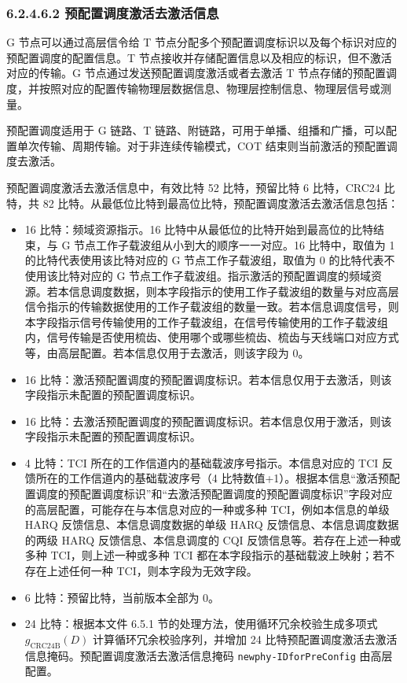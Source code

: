 \documentclass[11pt,a4paper]{ctexart}
\begin{document}
\subsubsection{6.2.4.6.2 预配置调度激活去激活信息}

G 节点可以通过高层信令给 T 节点分配多个预配置调度标识以及每个标识对应的预配置调度的配置信息。T 节点接收并存储配置信息以及相应的标识，但不激活对应的传输。G 节点通过发送预配置调度激活或者去激活 T 节点存储的预配置调度，并按照对应的配置传输物理层数据信息、物理层控制信息、物理层信号或测量。

预配置调度适用于 G 链路、T 链路、附链路，可用于单播、组播和广播，可以配置单次传输、周期传输。对于非连续传输模式，COT 结束则当前激活的预配置调度去激活。

预配置调度激活去激活信息中，有效比特 52 比特，预留比特 6 比特，CRC24 比特，共 82 比特。从最低位比特到最高位比特，预配置调度激活去激活信息包括：
\begin{itemize}[nosep]
  \item 16 比特：频域资源指示。16 比特中从最低位的比特开始到最高位的比特结束，与 G 节点工作子载波组从小到大的顺序一一对应。16 比特中，取值为 1 的比特代表使用该比特对应的 G 节点工作子载波组，取值为 0 的比特代表不使用该比特对应的 G 节点工作子载波组。指示激活的预配置调度的频域资源。若本信息调度数据，则本字段指示的使用工作子载波组的数量与对应高层信令指示的传输数据使用的工作子载波组的数量一致。若本信息调度信号，则本字段指示信号传输使用的工作子载波组，在信号传输使用的工作子载波组内，信号传输是否使用梳齿、使用哪个或哪些梳齿、梳齿与天线端口对应方式等，由高层配置。若本信息仅用于去激活，则该字段为 0。
  \item 16 比特：激活预配置调度的预配置调度标识。若本信息仅用于去激活，则该字段指示未配置的预配置调度标识。
  \item 16 比特：去激活预配置调度的预配置调度标识。若本信息仅用于激活，则该字段指示未配置的预配置调度标识。
  \item 4 比特：TCI 所在的工作信道内的基础载波序号指示。本信息对应的 TCI 反馈所在的工作信道内的基础载波序号（4 比特数值+1）。根据本信息``激活预配置调度的预配置调度标识''和``去激活预配置调度的预配置调度标识''字段对应的高层配置，可能存在与本信息对应的一种或多种 TCI，例如本信息的单级 HARQ 反馈信息、本信息调度数据的单级 HARQ 反馈信息、本信息调度数据的两级 HARQ 反馈信息、本信息调度的 CQI 反馈信息等。若存在上述一种或多种 TCI，则上述一种或多种 TCI 都在本字段指示的基础载波上映射；若不存在上述任何一种 TCI，则本字段为无效字段。
  \item 6 比特：预留比特，当前版本全部为 0。
  \item 24 比特：根据本文件 6.5.1 节的处理方法，使用循环冗余校验生成多项式 $g_{\mathrm{CRC24B}}(D)$ 计算循环冗余校验序列，并增加 24 比特预配置调度激活去激活信息掩码。预配置调度激活去激活信息掩码 \texttt{newphy-IDforPreConfig} 由高层配置。
\end{itemize}
\end{document}

